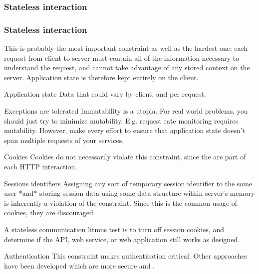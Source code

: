 \subsubsection{Stateless interaction}

\begin{frame}[allowframebreaks]
	\frametitle{Stateless interaction}
	
	This is probably the most important constraint as well as the hardest one: each request from client to server must contain all of the information necessary to understand the request, and cannot take advantage of any stored context on the server. Application state is therefore kept entirely on the client.
	
	\begin{block}{Application state}
		Data that could vary by client, and per request.
	\end{block}
	
	\begin{block}{Exceptions are tolerated}
		Immutability is a utopia. For real world problems, you should just try to minimize mutability. E.g. request rate monitoring requires mutability. 
		However, make every effort to ensure that application state doesn't span multiple requests of your services.
		
	\end{block}
	
	\framebreak
	
	\begin{block}{Cookies}
		Cookies do not necessarily violate this constraint, since the are part of each HTTP interaction.
	\end{block}
	
	\begin{alertblock}{Sessions identifiers}
		Assigning any sort of temporary session identifier to the some user *and* storing session data using some data structure within server's memory is inherently a violation of the constraint.
		Since this is the common usage of cookies, they are discouraged.
	\end{alertblock}
	
	\begin{example}
		A stateless communication litmus test is to turn off session cookies, and determine if the API, web service, or web application still works as designed.
	\end{example}
	
	\framebreak
		
	\begin{block}{Authentication}
		This constraint makes authentication critical. Other approaches have been developed which are more secure and \restful. 
	\end{block}
\end{frame}

